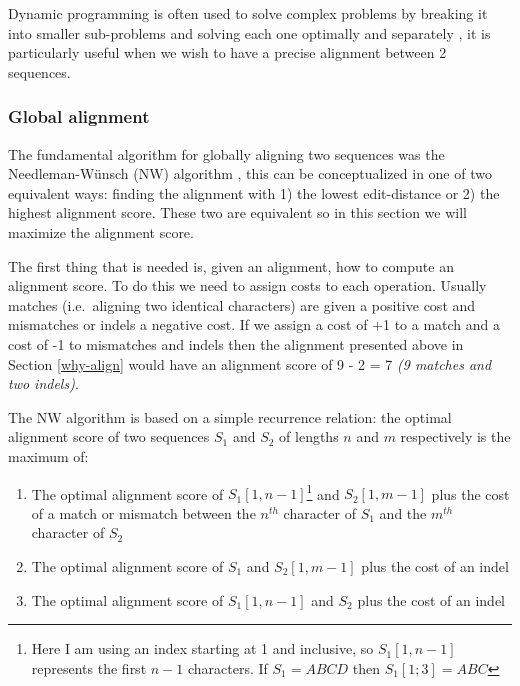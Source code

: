 \documentclass[
  11pt,
  twoside]{scrbook}
\begin{document}
Dynamic programming is often used to solve complex problems by breaking it into smaller sub-problems and solving each one optimally and separately \autocite{bradleyAppliedMathematicalProgramming1977,bellmanTheoryDynamicProgramming1954}, it is particularly useful when we wish to have a precise alignment between 2 sequences.

\hypertarget{global-alignment}{%
\subsubsection{Global alignment}\label{global-alignment}}

The fundamental algorithm for globally aligning two sequences was the Needleman-Wünsch (NW) algorithm \autocite{needlemanGeneralMethodApplicable1970}, this can be conceptualized in one of two equivalent ways: finding the alignment with 1) the lowest edit-distance or 2) the highest alignment score. These two are equivalent so in this section we will maximize the alignment score.

The first thing that is needed is, given an alignment, how to compute an alignment score. To do this we need to assign costs to each operation. Usually matches (i.e.~aligning two identical characters) are given a positive cost and mismatches or indels a negative cost. If we assign a cost of +1 to a match and a cost of -1 to mismatches and indels then the alignment presented above in Section \ref{why-align} would have an alignment score of 9 - 2 = 7 \emph{(9 matches and two indels)}.

The NW algorithm is based on a simple recurrence relation: the optimal alignment score of two sequences \(S_1\) and \(S_2\) of lengths \(n\) and \(m\) respectively is the maximum of:

\begin{enumerate}
\def\labelenumi{\arabic{enumi}.}
\item
  The optimal alignment score of \(S_1[1,n-1]\)\footnote{Here I am using an index starting at 1 and inclusive, so \(S_1[1,n-1]\) represents the first \(n-1\) characters. If \(S_1 = ABCD\) then \(S_1[1;3]=ABC\)} and \(S_2[1,m-1]\) plus the cost of a match or mismatch between the \(n^{th}\) character of \(S_1\) and the \(m^{th}\) character of \(S_2\)
\item
  The optimal alignment score of \(S_1\) and \(S_2[1,m-1]\) plus the cost of an indel
\item
  The optimal alignment score of \(S_1[1,n-1]\) and \(S_2\) plus the cost of an indel
\end{enumerate}
\end{document}
